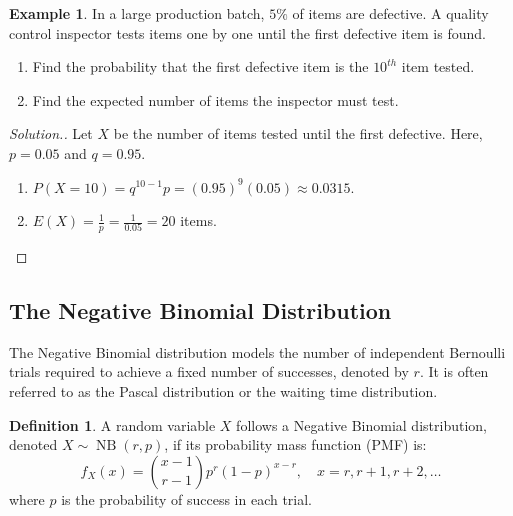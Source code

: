 \documentclass[12pt,a4paper]{report}
\theoremstyle{definition}
\newtheorem{definition}[thm]{Definition}
\newtheorem{example}[thm]{Example}
\theoremstyle{plain}
\theoremstyle{definition}
\newenvironment{solution}
  {\renewcommand{\qedsymbol}{}\begin{proof}[\textit{Solution}.]}
  {\end{proof}}
\begin{document}
\begin{example}
In a large production batch, $5\%$ of items are defective. A quality control inspector tests items one by one until the first defective item is found.
\begin{enumerate}
\item[(i)] Find the probability that the first defective item is the $10^{th}$ item tested.
\item[(ii)] Find the expected number of items the inspector must test.
\end{enumerate}
\end{example}

\begin{solution}
Let $X$ be the number of items tested until the first defective. Here, $p = 0.05$ and $q = 0.95$.
\begin{enumerate}
\item[(i)] $P(X=10) = q^{10-1}p = (0.95)^9(0.05) \approx 0.0315$.
\item[(ii)] $E(X) = \frac{1}{p} = \frac{1}{0.05} = 20$ items.
\end{enumerate}
\end{solution}


















\subsection{The Negative Binomial Distribution}
The Negative Binomial distribution models the number of independent Bernoulli trials required to achieve a fixed number of successes, denoted by $r$. It is often referred to as the Pascal distribution or the waiting time distribution.


\begin{definition}
A random variable $X$ follows a Negative Binomial distribution, denoted $X \sim \operatorname{NB}(r, p)$, if its probability mass function (PMF) is:\[ f_X(x) = \binom{x-1}{r-1} p^r (1-p)^{x-r}, \quad x = r, r+1, r+2, \dots \]where $p$ is the probability of success in each trial.
\end{definition}
\end{document}
